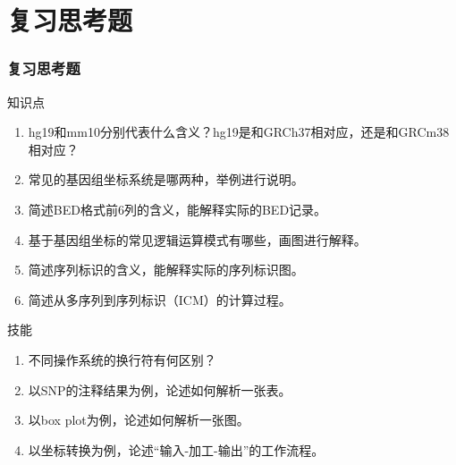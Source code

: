 \section{复习思考题}
\begin{frame}
  \frametitle{复习思考题}
  \begin{block}{知识点}
    \begin{enumerate}
      \item hg19和mm10分别代表什么含义？hg19是和GRCh37相对应，还是和GRCm38相对应？
      \item 常见的基因组坐标系统是哪两种，举例进行说明。
      \item 简述BED格式前6列的含义，能解释实际的BED记录。
      \item 基于基因组坐标的常见逻辑运算模式有哪些，画图进行解释。
      \item 简述序列标识的含义，能解释实际的序列标识图。
      \item 简述从多序列到序列标识（ICM）的计算过程。
    \end{enumerate}
  \end{block}
  \begin{block}{技能}
    \begin{enumerate}
      \item 不同操作系统的换行符有何区别？
      \item 以SNP的注释结果为例，论述如何解析一张表。
      \item 以box plot为例，论述如何解析一张图。
      \item 以坐标转换为例，论述“输入-加工-输出”的工作流程。
    \end{enumerate}
  \end{block}
\end{frame}
